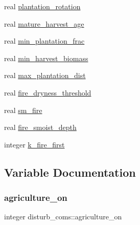 \begin{DoxyCompactItemize}
real \hyperlink{namespacedisturb__coms_a376a3a991d013bb7fc01f11392b85e71}{plantation\+\_\+rotation}
\item 
real \hyperlink{namespacedisturb__coms_af53cc051638d63f8646b4e46eef9366a}{mature\+\_\+harvest\+\_\+age}
\item 
real \hyperlink{namespacedisturb__coms_a05d657ee432105896bdb7fce6388217a}{min\+\_\+plantation\+\_\+frac}
\item 
real \hyperlink{namespacedisturb__coms_ab882a91f3ed60ed6a1532793d166e34d}{min\+\_\+harvest\+\_\+biomass}
\item 
real \hyperlink{namespacedisturb__coms_a0591e026b4cc3e583767cc06fe811531}{max\+\_\+plantation\+\_\+dist}
\item 
real \hyperlink{namespacedisturb__coms_ac6b6e373955307b8433f33253ca71d3d}{fire\+\_\+dryness\+\_\+threshold}
\item 
real \hyperlink{namespacedisturb__coms_a78e160b31b155e0e0dbddbe1c6614c1c}{sm\+\_\+fire}
\item 
real \hyperlink{namespacedisturb__coms_a62195251813b8226366eb5ae407dd196}{fire\+\_\+smoist\+\_\+depth}
\item 
integer \hyperlink{namespacedisturb__coms_a867cc15822253a03763c6890d6bdabc9}{k\+\_\+fire\+\_\+first}
\end{DoxyCompactItemize}


\subsection{Variable Documentation}
\mbox{\label{namespacedisturb__coms_a42942f09e1f80adbb629f5bc82d36127}} 
\subsubsection{\texorpdfstring{agriculture\+\_\+on}{agriculture\_on}}
{\footnotesize\ttfamily integer disturb\+\_\+coms\+::agriculture\+\_\+on}

\mbox{\label{namespacedisturb__coms_ac6b6e373955307b8433f33253ca71d3d}} 
